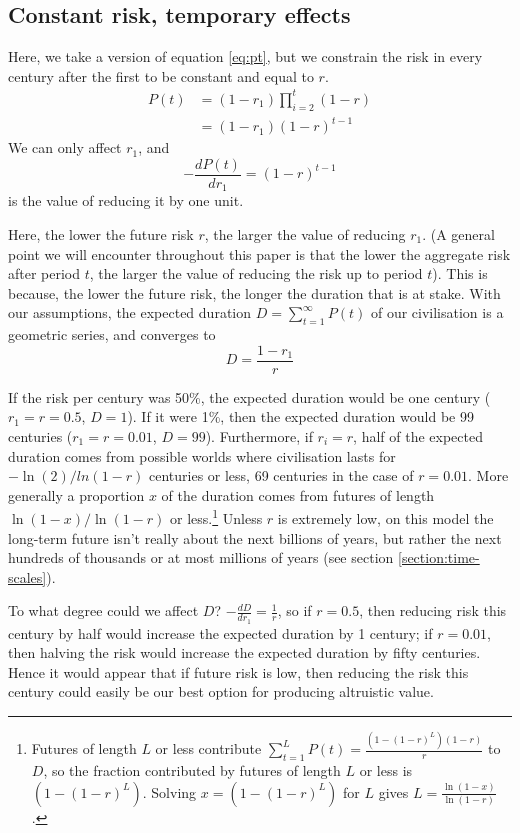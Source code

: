 \documentclass[british]{article}
\begin{document}
\subsection{Constant risk, temporary effects}\label{cr-te}


Here, we take a version of equation \ref{eq:pt}, but we constrain the risk in every century after the first to be constant and equal to $r$.
\begin{align*}
P(t) &= (1-r_1) \prod_{i=2}^{t}(1-r) \\
&= (1-r_1)(1-r)^{t-1}
\end{align*}
We can only affect $r_1$, and \[-\frac{dP(t)}{dr_1} = (1-r) ^{t-1}\] is the value of reducing it by one unit.

Here, the lower the future risk \(r\), the larger the value of reducing
\(r_1\). (A general point we will encounter throughout this paper is that the lower the aggregate risk after period $t$, the larger the value of reducing the risk up to period $t$). This is because, the lower the future risk, the longer the duration that is at stake. With our assumptions, the expected duration $D=\sum_{t=1}^\infty P(t)$ of our civilisation is a geometric series, and converges to $$D=\frac{1-r_1}{r}$$

If the risk per century was 50\%, the expected duration would be one century ($r_1=r=0.5$, $D=1$). If it were 1\%, then the expected duration would be 99 centuries ($r_1=r=0.01$, $D=99$). Furthermore, if $r_i=r$, half of the expected duration comes from possible worlds where civilisation lasts for $-\ln(2)/ln(1-r)$ centuries or less, 69 centuries in the case of $r=0.01$. More generally a proportion $x$ of the duration comes from futures of length $\ln(1-x)/\ln(1-r)$ or less.\footnote{Futures of length $L$ or less contribute $\sum_{t=1}^L P(t)=\frac{(1-(1-r)^L)(1-r)}{r}$ to $D$, so the fraction contributed by futures of length $L$ or less is $(1-(1-r)^L)$. Solving $x=(1-(1-r)^L)$ for $L$ gives $L=\frac{\ln(1-x)}{\ln(1-r)}$.} Unless $r$ is extremely low, on this model the long-term future isn't really about the next billions of years, but rather the next hundreds of thousands or at most millions of years (see section \ref{section:time-scales}).

To what degree could we affect $D$? $-\frac{dD}{dr_1}=\frac{1}{r}$, so if $r=0.5$, then reducing risk this century by half would increase the expected duration by 1 century; if $r=0.01$, then halving the risk would increase the expected duration by fifty centuries. Hence it would appear that if future risk is low, then reducing the risk this century could easily be our best option for producing altruistic value.
\end{document}

